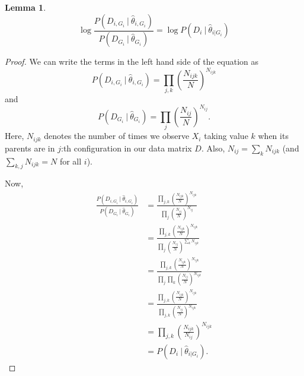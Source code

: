 \documentclass[12pt]{article}
\newcommand{\Le}{\left(}
\newcommand{\Ri}{\right)}
\newtheorem{lemma}{Lemma}
\begin{document}
\begin{lemma}
$$
\log \frac{P(D_{i, G_i} \ | \ \hat{\theta}_{i, G_i} )}{P(D_{G_i} \ | \ \hat{\theta}_{G_i} )} = \log P(D_i \ | \ \hat{\theta}_{i | G_i} )
$$
\end{lemma}
\begin{proof}
We can write the terms in the left hand side of the equation as
$$
P(D_{i, G_i} \ | \ \hat{\theta}_{i, G_i}) = \prod_{j,k} \Le \frac{N_{ijk}}{N}  \Ri^{N_{ijk}}
$$and
$$
P(D_{G_i} \ | \ \hat{\theta}_{G_i} ) =  \prod_{j} \Le \frac{N_{ij}}{N}  \Ri^{N_{ij}}.
$$Here, $N_{ijk}$ denotes the number of times we observe $X_i$ taking value $k$ when its parents are in $j$:th configuration in our data matrix $D$. Also, $N_{ij} = \sum_k N_{ijk}$ (and $\sum_{k,j}N_{ijk} = N$ for all $i$).

Now,
\begin{align*}
\frac{P(D_{i, G_i} \ | \ \hat{\theta}_{i, G_i} )}{P(D_{G_i} \ | \ \hat{\theta}_{G_i} )} &= \frac{ \prod_{j,k} \Le \frac{N_{ijk}}{N}  \Ri^{N_{ijk}}}{\prod_{j} \Le \frac{N_{ij}}{N}  \Ri^{N_{ij}}} \\
&= \frac{ \prod_{j,k} \Le \frac{N_{ijk}}{N}  \Ri^{N_{ijk}}}{\prod_{j} \Le \frac{N_{ij}}{N}  \Ri^{\sum_k N_{ijk}}} \\
&= \frac{ \prod_{j,k} \Le \frac{N_{ijk}}{N}  \Ri^{N_{ijk}}}{\prod_{j}\prod_{k} \Le \frac{N_{ij}}{N}  \Ri^{N_{ijk}}} \\ &= \frac{ \prod_{j,k} \Le \frac{N_{ijk}}{N}  \Ri^{N_{ijk}}}{\prod_{j,k} \Le \frac{N_{ij}}{N}  \Ri^{N_{ijk}}} \\
&= \prod_{j,k} \Le \frac{N_{ijk}}{N_{ij}} \Ri^{N_{ijk}} \\
&= P(D_i \ | \ \hat{\theta}_{i | G_i} ).
\end{align*} 
\end{proof}
\end{document}

